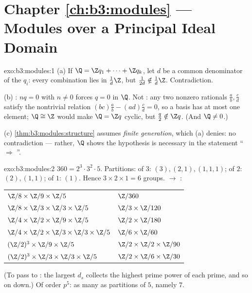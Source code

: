 \section*{Chapter \ref{ch:b3:modules} --- Modules over a Principal
Ideal Domain}

\begin{solution}{exo:b3:modules:1}
(a) If $\Q = \Z q_1 + \dots + \Z q_k$, let $d$ be a common
denominator of the $q_i$: every combination lies in $\frac1d\Z$,
but $\frac1{2d} \notin \frac1d\Z$. Contradiction.

(b) : $nq = 0$ with $n \neq 0$ forces $q = 0$ in
$\Q$. Not : any two nonzero rationals $\frac ab, \frac cd$
satisfy the nontrivial relation $(bc)\frac ab - (ad)\frac cd =
0$, so a basis has at most one element; $\Q \cong \Z$ would make
$\Q = \Z q$ cyclic, but $\frac q2 \notin \Z q$. (And $\Q \neq
0$.)

(c) \cref{thm:b3:modules:structure} assumes \emph{finite
generation}, which (a) denies: no contradiction --- rather, $\Q$
shows the hypothesis is necessary in the statement
`` $\Rightarrow$ ''.
\end{solution}

\begin{solution}{exo:b3:modules:2}
$360 = 2^3\cdot3^2\cdot5$. Partitions: of $3$: $(3), (2,1),
(1,1,1)$; of $2$: $(2), (1,1)$; of $1$: $(1)$. Hence $3 \times 2
\times 1 = 6$ groups.  $\to$ :
\begin{center}
\begin{tabular}{l l}
$\Z/8 \times \Z/9 \times \Z/5$ & $\Z/360$\\
$\Z/8 \times \Z/3 \times \Z/3 \times \Z/5$ & $\Z/3 \times
\Z/120$\\
$\Z/4 \times \Z/2 \times \Z/9 \times \Z/5$ & $\Z/2 \times
\Z/180$\\
$\Z/4 \times \Z/2 \times \Z/3 \times \Z/3 \times \Z/5$ & $\Z/6
\times \Z/60$\\
$(\Z/2)^3 \times \Z/9 \times \Z/5$ & $\Z/2 \times \Z/2 \times
\Z/90$\\
$(\Z/2)^3 \times \Z/3 \times \Z/3 \times \Z/5$ & $\Z/2 \times
\Z/6 \times \Z/30$
\end{tabular}
\end{center}
(To pass to : the largest $d_s$ collects the
highest prime power of each prime, and so on down.) Of order
$p^5$: as many as partitions of $5$, namely $7$.
\end{solution}

